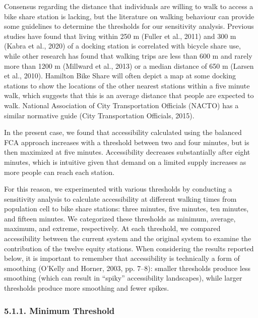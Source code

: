 \documentclass[]{elsarticle} %
\begin{document}
Consensus regarding the distance that individuals are willing to walk to
access a bike share station is lacking, but the literature on walking
behaviour can provide some guidelines to determine the thresholds for
our sensitivity analysis. Previous studies have found that living within
250 m (Fuller et al., 2011) and 300 m (Kabra et al., 2020) of a docking
station is correlated with bicycle share use, while other research has
found that walking trips are less than 600 m and rarely more than 1200 m
(Millward et al., 2013) or a median distance of 650 m (Larsen et al.,
2010). Hamilton Bike Share will often depict a map at some docking
stations to show the locations of the other nearest stations within a
five minute walk, which suggests that this is an average distance that
people are expected to walk. National Association of City Transportation
Officials (NACTO) has a similar normative guide (City Transportation
Officials, 2015).

In the present case, we found that accessibility calculated using the
balanced FCA approach increases with a threshold between two and four
minutes, but is then maximized at five minutes. Accessibility decreases
substantially after eight minutes, which is intuitive given that demand
on a limited supply increases as more people can reach each station.

For this reason, we experimented with various thresholds by conducting a
sensitivity analysis to calculate accessibility at different walking
times from population cell to bike share stations: three minutes, five
minutes, ten minutes, and fifteen minutes. We categorized these
thresholds as minimum, average, maximum, and extreme, respectively. At
each threshold, we compared accessibility between the current system and
the original system to examine the contribution of the twelve equity
stations. When considering the results reported below, it is important
to remember that accessibility is technically a form of smoothing
(O'Kelly and Horner, 2003, pp. 7--8): smaller thresholds produce less
smoothing (which can result in ``spiky'' accessibility landscapes),
while larger thresholds produce more smoothing and fewer spikes.

\hypertarget{minimum-threshold}{%
\subsubsection{5.1.1. Minimum Threshold}\label{minimum-threshold}}
\end{document}

